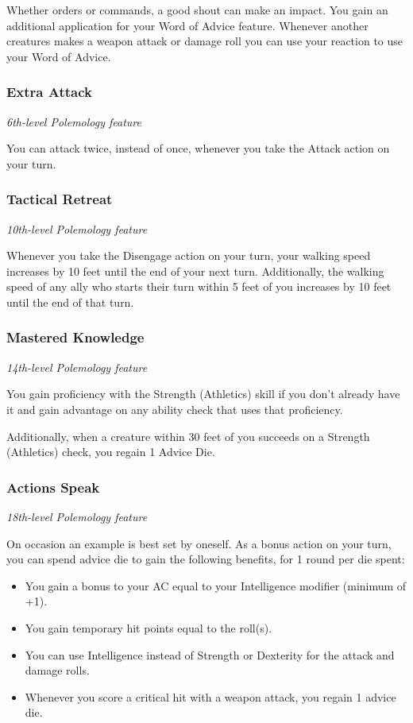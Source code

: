 \documentclass[letterpaper,openany,twoside,twocolumn]{book}
\begin{document}
	Whether orders or commands, a good shout can make an impact. You gain an additional application for your Word of Advice feature. Whenever another creatures makes a weapon attack or damage roll you can use your reaction to use your Word of Advice.
	
	\subsubsection*{Extra Attack}
	\textnormal{\textit{6th-level Polemology feature}}
	
	You can attack twice, instead of once, whenever you take the Attack action on your turn.
	
	\subsubsection*{Tactical Retreat}
	\textnormal{\textit{10th-level Polemology feature}}
	
	Whenever you take the Disengage action on your turn, your walking speed increases by 10 feet until the end of your next turn. Additionally, the walking speed of any ally who starts their turn within 5 feet of you increases by 10 feet until the end of that turn.
	
	\subsubsection*{Mastered Knowledge}
	\textnormal{\textit{14th-level Polemology feature}}
	
	You gain proficiency with the Strength (Athletics) skill if you don’t already have it and gain advantage on any ability check that uses that proficiency.
	
	Additionally, when a creature within 30 feet of you succeeds on a Strength (Athletics) check, you regain 1 Advice Die.
	
	\subsubsection*{Actions Speak}
	\textnormal{\textit{18th-level Polemology feature}}
	
	On occasion an example is best set by oneself. As a bonus action on your turn, you can spend advice die to gain the following benefits, for 1 round per die spent:
	
	\begin{itemize}
		\item You gain a bonus to your AC equal to your Intelligence modifier (minimum of +1).
		\item You gain temporary hit points equal to the roll(s).
		\item You can use Intelligence instead of Strength or Dexterity for the attack and damage rolls.
		\item Whenever you score a critical hit with a weapon attack, you regain 1 advice die.	
	\end{itemize}
	
\end{document}
